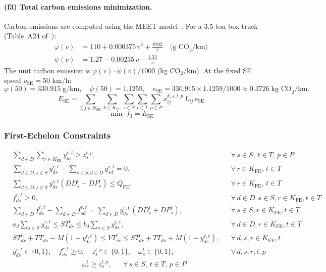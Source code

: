 \documentclass[11pt, a4paper]{article}
\newcommand{\KFE}{K_{\mathrm{FE}}}
\newcommand{\KSE}{K_{\mathrm{SE}}}
\newcommand{\NSE}{N_{\mathrm{SE}}}
\newcommand{\QFE}{Q_{\mathrm{FE}}}
\newcommand{\eSE}{e_{\mathrm{SE}}}
\newcommand{\vSE}{v_{\mathrm{SE}}}
\newcommand{\ESE}{E_{\mathrm{SE}}}
\numberwithin{equation}{section}
\begin{document}
\paragraph{(f3) Total carbon emissions minimization.}
Carbon emissions are computed using the MEET model~\cite{hickman1999}.
For a 3.5-ton box truck (Table~A24 of~\cite{hickman1999}):
\begin{align}
  \varphi(v) &= 110 + 0.000375\,v^3 + \frac{8702}{v}
  \quad\text{(g CO}_2\text{/km)}
  \label{eq:phi} \\
  \psi(v)    &= 1.27 - 0.00235\,v - \frac{1.33}{v}
  \label{eq:psi}
\end{align}
The unit carbon emission is $\varphi(v)\cdot\psi(v)/1000$ (kg CO$_2$/km).
At the fixed SE speed $\vSE=50$ km/h:
\[
  \varphi(50)=330.915\;\text{g/km},\quad
  \psi(50)=1.1259,\quad
  \eSE=330.915\times1.1259/1000\approx0.3726\;\text{kg CO}_2\text{/km.}
\]
\begin{equation}
  \ESE = \sum_{i,j\in\NSE}\sum_{k\in\KSE}\sum_{s\in S}\sum_{t\in T}\sum_{p\in P}
           x_{ij}^{k,s,t,p}\,L_{ij}\,\eSE
  \label{eq:ESE}
\end{equation}
\begin{equation}
  \min\;f_3 = \ESE
  \label{eq:f3}
\end{equation}

\subsubsection{First-Echelon Constraints}

\begin{align}
  &\sum_{d\in D}\sum_{r\in\KFE}y_{ds}^{r,t} \ge z_s^{t,p},
  &&\forall\,s\in S,\,t\in T,\,p\in P
  \tag{C1}\label{c1}\\
  &\sum_{d\in D,s\in S}y_{ds}^{r,t}-\sum_{s\in S,d\in D}y_{sd}^{r,t}=0,
  &&\forall\,r\in\KFE,\,t\in T
  \tag{C2}\label{c2}\\
  &\sum_{d\in D,s\in S}y_{ds}^{r,t}(DD_s^t+DP_s^t)\le\QFE,
  &&\forall\,r\in\KFE,\,t\in T
  \tag{C3}\label{c3}\\
  &f_{ds}^{r,t}\ge 0,
  &&\forall\,d\in D,s\in S,r\in\KFE,t\in T
  \tag{C4a}\label{c4a}\\
  &\sum_{d\in D}f_{ds}^{r,t}-\sum_{d\in D}f_{sd}^{r,t}
    =\sum_{d\in D}y_{ds}^{r,t}\,(DD_s^t+DP_s^t),
  &&\forall\,s\in S,r\in\KFE,t\in T
  \tag{C4b}\label{c4b}\\
  &a_d\sum_{s\in S}y_{ds}^{r,t}\le ST_{dr}^t\le b_d\sum_{s\in S}y_{ds}^{r,t},
  &&\forall\,d\in D,r\in\KFE,t\in T
  \tag{C5}\label{c5}\\
  &ST_{dr}^t+TT_{ds}-M(1-y_{ds}^{r,t})\le VT_{sr}^t
    \le ST_{dr}^t+TT_{ds}+M(1-y_{ds}^{r,t}),
  &&\forall\,d,s,r\in\KFE,t
  \tag{C6}\label{c6}\\
  &y_{ds}^{r,t}\in\{0,1\},\quad
  f_{ds}^{r,t}\ge 0,\quad
  z_s^{t,p}\in\{0,1\},\quad
  \omega_s^t\in\{0,1\},
  &&\forall\,d,s,r,t,p
  \tag{C7}\label{c7}
\end{align}
\begin{align}
  &\omega_s^t \ge z_s^{t,p},
  &&\forall\,s\in S,\,t\in T,\,p\in P
  \tag{C8}\label{c8}
\end{align}
\end{document}
